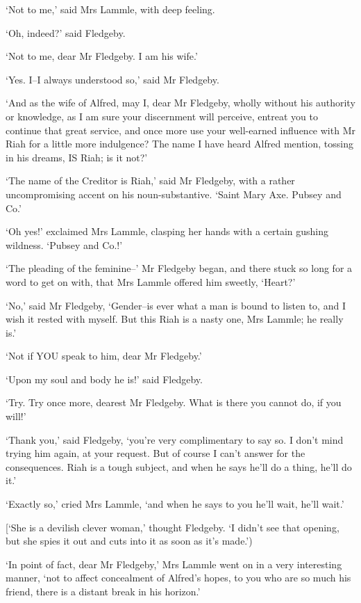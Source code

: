 ‘Not to me,’ said Mrs Lammle, with deep feeling.

‘Oh, indeed?’ said Fledgeby.

‘Not to me, dear Mr Fledgeby. I am his wife.’

‘Yes. I--I always understood so,’ said Mr Fledgeby.

‘And as the wife of Alfred, may I, dear Mr Fledgeby, wholly without his
authority or knowledge, as I am sure your discernment will perceive,
entreat you to continue that great service, and once more use your
well-earned influence with Mr Riah for a little more indulgence? The
name I have heard Alfred mention, tossing in his dreams, IS Riah; is it
not?’

‘The name of the Creditor is Riah,’ said Mr Fledgeby, with a rather
uncompromising accent on his noun-substantive. ‘Saint Mary Axe. Pubsey
and Co.’

‘Oh yes!’ exclaimed Mrs Lammle, clasping her hands with a certain
gushing wildness. ‘Pubsey and Co.!’

‘The pleading of the feminine--’ Mr Fledgeby began, and there stuck so
long for a word to get on with, that Mrs Lammle offered him sweetly,
‘Heart?’

‘No,’ said Mr Fledgeby, ‘Gender--is ever what a man is bound to listen
to, and I wish it rested with myself. But this Riah is a nasty one, Mrs
Lammle; he really is.’

‘Not if YOU speak to him, dear Mr Fledgeby.’

‘Upon my soul and body he is!’ said Fledgeby.

‘Try. Try once more, dearest Mr Fledgeby. What is there you cannot do,
if you will!’

‘Thank you,’ said Fledgeby, ‘you’re very complimentary to say so. I
don’t mind trying him again, at your request. But of course I can’t
answer for the consequences. Riah is a tough subject, and when he says
he’ll do a thing, he’ll do it.’

‘Exactly so,’ cried Mrs Lammle, ‘and when he says to you he’ll wait,
he’ll wait.’

[‘She is a devilish clever woman,’ thought Fledgeby. ‘I didn’t see that
opening, but she spies it out and cuts into it as soon as it’s made.’)

‘In point of fact, dear Mr Fledgeby,’ Mrs Lammle went on in a very
interesting manner, ‘not to affect concealment of Alfred’s hopes, to you
who are so much his friend, there is a distant break in his horizon.’


